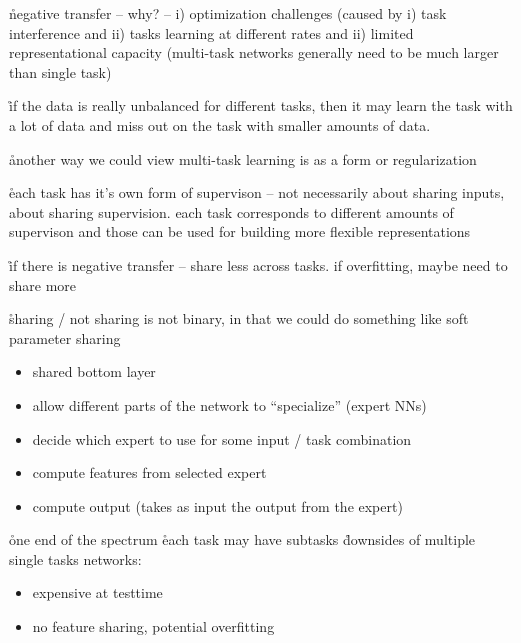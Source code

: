 \r{negative transfer -- why? -- i) optimization challenges (caused by i) task interference and ii) tasks learning at different rates and ii) limited representational capacity (multi-task networks generally need to be much larger than single task)}

\r{if the data is really unbalanced for different tasks, then it may learn the task with a lot of data and miss out on the task with smaller amounts of data.}


\r{another way we could view multi-task learning is as a form or regularization}

\r{each task has it's own form of supervison -- not necessarily about sharing inputs, about sharing supervision. each task corresponds to different amounts of supervison and those can be used for building more flexible representations}

\r{if there is negative transfer -- share less across tasks. if overfitting, maybe need to share more}

\r{sharing / not sharing is not binary, in that we could do something like soft parameter sharing}


\begin{itemize}[noitemsep,topsep=0pt]
	\item shared bottom layer
	\item allow different parts of the network to ``specialize'' (expert NNs)
	\item decide which expert to use for some input / task combination
	\item compute features from selected expert
	\item compute output (takes as input the output from the expert)
\end{itemize}



\r{one end of the spectrum}
\r{each task may have subtasks}
\r{downsides of multiple single tasks networks:}
\begin{itemize}[noitemsep,topsep=0pt]
	\item expensive at testtime
	\item no feature sharing, potential overfitting
\end{itemize}

